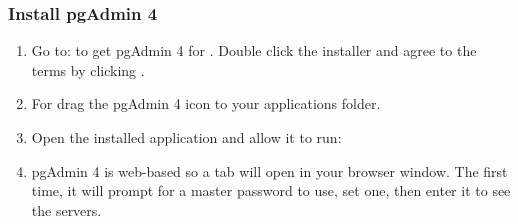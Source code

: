 \documentclass[a4paper,11pt,english]{sphinxmanual}
\begin{document}
\subsubsection{Install pgAdmin 4}
\label{\detokenize{installation_mac:install-pgadmin-4}}\begin{enumerate}
\def\theenumi{\arabic{enumi}}
\def\labelenumi{\theenumi .}
\makeatletter\def\p@enumii{\p@enumi \theenumi .}\makeatother
\item {} 
Go to:  to get pgAdmin 4 for . Double click the installer and agree to the terms by clicking .

\noindent{}

\item {} 
For  drag the pgAdmin 4 icon to your applications folder.

\noindent{}

\item {} 
Open the installed application and allow it to run:

\noindent{}

\item {} 
pgAdmin 4 is web-based so a tab will open in your browser window. The first time, it will prompt for a master password to use, set one, then enter it to see the servers.

\end{enumerate}
\end{document}
